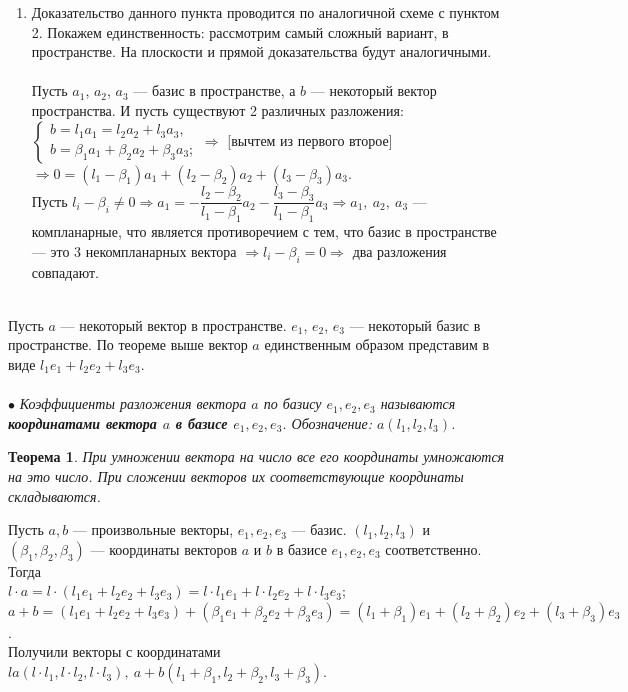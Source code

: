 \begin{Proof}
\begin{enumerate}
		\item Доказательство данного пункта проводится по аналогичной схеме с пунктом 2. Покажем единственность: рассмотрим самый сложный вариант, в пространстве. На плоскости и прямой доказательства будут аналогичными.\\\\
		Пусть $a_1$, $a_2$, $a_3$ --- базис в пространстве, а $b$ --- некоторый вектор пространства. И пусть существуют 2 различных разложения:
		$\begin{cases}
			b = l_1 a_1 = l_2 a_2 + l_3 a_3,\\
			b = \beta_1 a_1 + \beta_2 a_2 + \beta_3 a _3;
		\end{cases}\Rightarrow$ [вычтем из первого второе] $\Rightarrow 0 = (l_1 - \beta_1) a_1 + (l_2 - \beta_2) a_2 + (l_3 - \beta_3) a_3$.\\
		Пусть $l_i - \beta_i\ne 0\Rightarrow a_1 = -\dfrac{l_2 - \beta_2}{l_1 - \beta_1}a_2 -\dfrac{l_3 - \beta_3}{l_1 - \beta_1}a_3\Rightarrow a_1,\ a_2,\ a_3$ --- компланарные, что является противоречием с тем, что базис в пространстве --- это 3 некомпланарных вектора $\Rightarrow l_i - \beta_i = 0\Rightarrow$ два разложения совпадают.
\end{enumerate}\end{Proof}\\
Пусть $a$ --- некоторый вектор в пространстве. $e_1$, $e_2$, $e_3$ --- некоторый базис в пространстве. По теореме выше вектор $a$ единственным образом представим в виде $l_1 e_1 + l_2 e_2 + l_3 e_3$.\\\\
$\bullet$ \textit{Коэффициенты разложения вектора $a$ по базису $e_1, e_2, e_3$ называются \textbf{координатами вектора $a$ в базисе $e_1, e_2, e_3$}. Обозначение: $a(l_1, l_2, l_3)$.}
\newtheorem*{th2_2_2}{Теорема}\begin{th2_2_2}
	При умножении вектора на число все его координаты умножаются на это число. При
	сложении векторов их соответствующие координаты складываются.
\end{th2_2_2}\begin{Proof}
	Пусть $a, b$ --- произвольные векторы, $e_1, e_2, e_3$ --- базис. $(l_1, l_2, l_3)$ и $(\beta_1, \beta_2, \beta_3)$ --- координаты векторов $a$ и $b$ в базисе $e_1, e_2, e_3$ соответственно. Тогда\\
	$l\cdot a = l\cdot(l_1 e_1 + l_2 e_2 + l_3 e_3) = l\cdot l_1 e_1 + l\cdot l_2 e_2 + l\cdot l_3 e_3$;\\
	$a+b = (l_1 e_1 + l_2 e_2 + l_3 e_3) + (\beta_1 e_1 + \beta_2 e_2 + \beta_3 e_3) = (l_1 + \beta_1) e_1 + (l_2 + \beta_2) e_2 + (l_3 + \beta_3) e_3$.\\
	Получили векторы с координатами $la(l\cdot l_1, l\cdot l_2, l\cdot l_3),\ a+b(l_1 + \beta_1, l_2 + \beta_2, l_3 + \beta_3)$.
\end{Proof}
